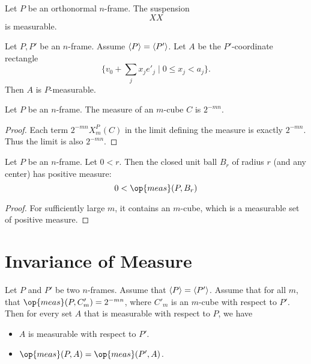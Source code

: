 \begin{lemma}  Let $P$ be an orthonormal $n$-frame.  The suspension
    $$
    XX
    $$
is measurable.
\end{lemma}

\begin{lemma}
Let $P,P'$ be an $n$-frame.  Assume ${\langle P\rangle} = {\langle P'\rangle}$. Let
$A$ be the $P'$-coordinate rectangle
    $$\{v_0 + \sum_j x_j e'_j \mid 0\le x_j < a_j\}.$$
Then $A$ is $P$-measurable.
\end{lemma}

\begin{lemma} Let $P$ be an $n$-frame.  The measure of an $m$-cube $C$ is
$2^{-m n}$.
\end{lemma}

\begin{proof} Each term $2^{-m n}X^P_m(C)$
in the limit defining the measure is exactly $2^{-m n}$.  Thus the
limit is also $2^{-m n}$.
\end{proof}

\begin{lemma}
Let $P$ be an $n$-frame.  Let $0 < r$.  Then the closed unit ball
$B_r$ of radius $r$ (and any center) has positive measure:
    $$0 < \op{meas}(P,B_r)$$
\end{lemma}

\begin{proof} For sufficiently large $m$, it contains an $m$-cube,
which is a measurable set of positive measure.
\end{proof}

\section{Invariance of Measure}

\begin{lemma}  Let $P$ and $P'$ be two $n$-frames.  Assume that
${\langle P\rangle} = {\langle P'\rangle}$.    Assume that for all $m$, that
$\op{meas}(P,C'_m) = 2^{-m n}$, where $C'_m$ is an $m$-cube with
respect to $P'$.  Then for every set $A$ that is measurable with
respect to $P$, we have
\begin{itemize}
        \item $A$ is measurable with respect to $P'$.
        \item $\op{meas}(P,A) = \op{meas}(P',A)$.
    \end{itemize}
\end{lemma}

